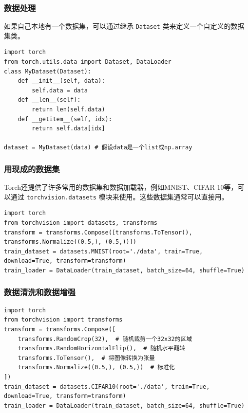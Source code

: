 \begin{frame}[fragile]
    \frametitle{数据处理}

    如果自己本地有一个数据集，可以通过继承 \texttt{Dataset} 类来定义一个自定义的数据集类。
    \begin{verbatim}
import torch
from torch.utils.data import Dataset, DataLoader 
class MyDataset(Dataset):
    def __init__(self, data):
        self.data = data
    def __len__(self):
        return len(self.data)
    def __getitem__(self, idx):
        return self.data[idx]

dataset = MyDataset(data) # 假设data是一个list或np.array
    \end{verbatim}

\end{frame}

\begin{frame}[fragile]
    \frametitle{用现成的数据集}

    Torch还提供了许多常用的数据集和数据加载器，例如MNIST、CIFAR-10等，可以通过 \texttt{torchvision.datasets} 模块来使用。这些数据集通常可以直接用。
    \begin{verbatim}
import torch
from torchvision import datasets, transforms
transform = transforms.Compose([transforms.ToTensor(), transforms.Normalize((0.5,), (0.5,))])
train_dataset = datasets.MNIST(root='./data', train=True, download=True, transform=transform)
train_loader = DataLoader(train_dataset, batch_size=64, shuffle=True)
    \end{verbatim}

\end{frame}

\begin{frame}[fragile]
    \frametitle{数据清洗和数据增强}

    \begin{verbatim}
import torch
from torchvision import transforms
transform = transforms.Compose([
    transforms.RandomCrop(32),  # 随机裁剪一个32x32的区域
    transforms.RandomHorizontalFlip(),  # 随机水平翻转
    transforms.ToTensor(),  # 将图像转换为张量
    transforms.Normalize((0.5,), (0.5,))  # 标准化
])
train_dataset = datasets.CIFAR10(root='./data', train=True, download=True, transform=transform)
train_loader = DataLoader(train_dataset, batch_size=64, shuffle=True)
    \end{verbatim}

\end{frame}

